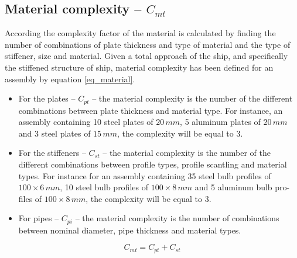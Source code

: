 \subsection{Material complexity -- $C_{mt}$}
According \cite{Rigterink2013} the complexity factor of the material is calculated by finding the number of combinations of plate thickness and type of material and the type of stiffener, size and material. 
Given a total approach of the ship, and specifically  the stiffened structure of ship, material complexity has been defined for an assembly by equation \ref{eq_material}.


\begin{itemize}
\item For the plates -- $C_{pt}$ -- the material complexity is the number of the different combinations between plate thickness and material type. For instance, an assembly containing 10 steel plates of $20 \, mm$, 5 aluminum plates of $20 \, mm$ and 3 steel plates of $15 \, mm$, the complexity will be equal to 3.
\item For the stiffeners -- $C_{st}$ -- the material complexity is the number of the different combinations between profile types, profile scantling and material types. For instance for an assembly containing 35 steel bulb profiles of $100 \times 6 \, mm$, 10 steel bulb profiles of $100 \times 8 \, mm$ and 5 aluminum bulb pro-files of $100 \times 8 \, mm$, the complexity will be equal to 3.
\item For pipes -- $C_{pi}$ -- the material complexity is the number of combinations between nominal diameter, pipe thickness and material types.
\end{itemize}


\begin{equation}
\label{eq_material}
C_{mt} = C_{pt}+C_{st}
\end{equation}


	
